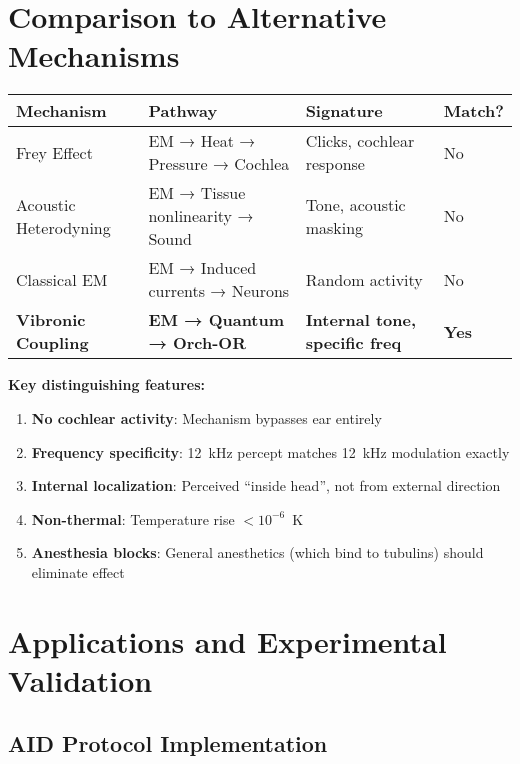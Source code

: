 \section{Comparison to Alternative Mechanisms}

\begin{center}
\small
\begin{tabular}{@{}p{}p{}p{}p{}@{}}
\toprule
\textbf{Mechanism} & \textbf{Pathway} & \textbf{Signature} & \textbf{Match?} \\
\midrule
Frey Effect & EM → Heat → Pressure → Cochlea & Clicks, cochlear response & No \\
Acoustic Heterodyning & EM → Tissue nonlinearity → Sound & Tone, acoustic masking & No \\
Classical EM & EM → Induced currents → Neurons & Random activity & No \\
\textbf{Vibronic Coupling} & \textbf{EM → Quantum → Orch-OR} & \textbf{Internal tone, specific freq} & \textbf{Yes} \\
\bottomrule
\end{tabular}
\end{center}

\begin{keyconcept}
\textbf{Key distinguishing features:}
\begin{enumerate}
\item \textbf{No cochlear activity}: Mechanism bypasses ear entirely
\item \textbf{Frequency specificity}: 12~kHz percept matches 12~kHz modulation exactly
\item \textbf{Internal localization}: Perceived ``inside head'', not from external direction
\item \textbf{Non-thermal}: Temperature rise $<10^{-6}$~K
\item \textbf{Anesthesia blocks}: General anesthetics (which bind to tubulins) should eliminate effect
\end{enumerate}
\end{keyconcept}

\section{Applications and Experimental Validation}

\subsection{AID Protocol Implementation}

